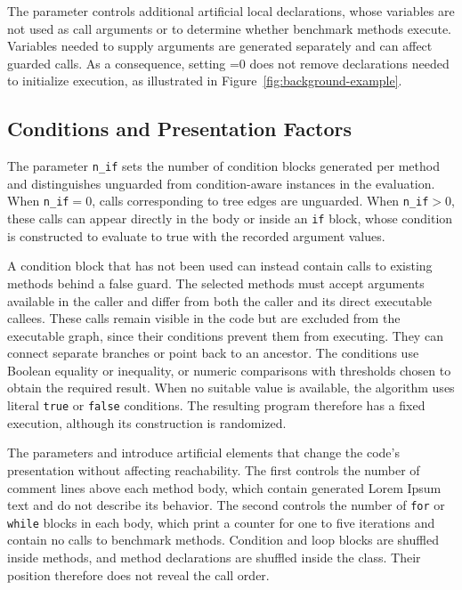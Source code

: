 The parameter  controls additional artificial local declarations, whose variables are not used as call arguments or to determine whether benchmark methods execute. Variables needed to supply arguments are generated separately and can affect guarded calls. As a consequence, setting =0 does not remove declarations needed to initialize execution, as illustrated in Figure~\ref{fig:background-example}.

\subsection{Conditions and Presentation Factors}

The parameter \mbox{\texttt{n\_if}} sets the number of condition blocks generated per method and distinguishes unguarded from condition-aware instances in the evaluation. When \mbox{\texttt{n\_if}$=0$}, calls corresponding to tree edges are unguarded. When \mbox{\texttt{n\_if}$>0$}, these calls can appear directly in the body or inside an \texttt{if} block, whose condition is constructed to evaluate to true with the recorded argument values.

A condition block that has not been used can instead contain calls to existing methods behind a false guard. The selected methods must accept arguments available in the caller and differ from both the caller and its direct executable callees. These calls remain visible in the code but are excluded from the executable graph, since their conditions prevent them from executing. They can connect separate branches or point back to an ancestor. The conditions use Boolean equality or inequality, or numeric comparisons with thresholds chosen to obtain the required result. When no suitable value is available, the algorithm uses literal \texttt{true} or \texttt{false} conditions. The resulting program therefore has a fixed execution, although its construction is randomized.

The parameters  and  introduce artificial elements that change the code's presentation without affecting reachability. The first controls the number of comment lines above each method body, which contain generated Lorem Ipsum text and do not describe its behavior. The second controls the number of \texttt{for} or \texttt{while} blocks in each body, which print a counter for one to five iterations and contain no calls to benchmark methods. Condition and loop blocks are shuffled inside methods, and method declarations are shuffled inside the class. Their position therefore does not reveal the call order.

